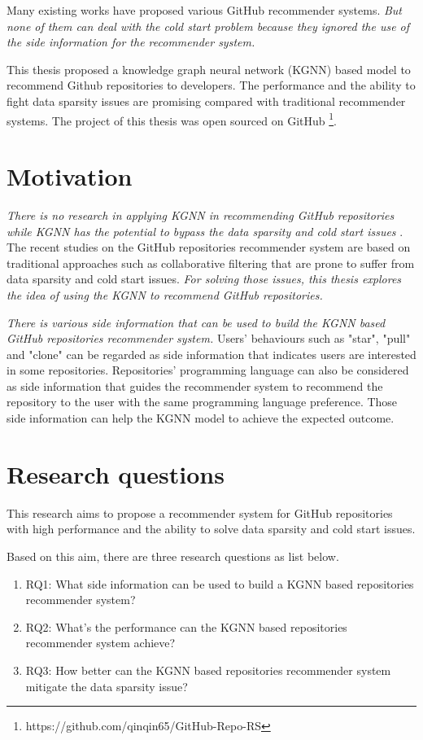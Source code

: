 \documentclass[11pt,twoside]{report}
\begin{document}
Many existing works have proposed various GitHub recommender systems. \textit{But none of them can deal with the cold start problem because they ignored the use of the side information for the recommender system.}

This thesis proposed a knowledge graph neural network (KGNN) based model to recommend Github repositories to developers. The performance and the ability to fight data sparsity issues are promising compared with traditional recommender systems. The project of this thesis was open sourced on GitHub \footnote{https://github.com/qinqin65/GitHub-Repo-RS}.

\section{Motivation}
\textit{There is no research in applying KGNN in recommending GitHub repositories while KGNN has the potential to bypass the data sparsity and cold start issues} \cite{mansur_review_nodate}. The recent studies on the GitHub repositories recommender system are based on traditional approaches such as collaborative filtering that are prone to suffer from data sparsity and cold start issues. \textit{For solving those issues, this thesis explores the idea of using the KGNN to recommend GitHub repositories.}

\textit{There is various side information that can be used to build the KGNN based GitHub repositories recommender system.} Users’ behaviours such as "star", "pull" and "clone" can be regarded as side information that indicates users are interested in some repositories. Repositories' programming language can also be considered as side information that guides the recommender system to recommend the repository to the user with the same programming language preference. Those side information can help the KGNN model to achieve the expected outcome.

\section{Research questions}
This research aims to propose a recommender system for GitHub repositories with high performance and the ability to solve data sparsity and cold start issues.

Based on this aim, there are three research questions as list below.

\begin{enumerate}
    \item RQ1: What side information can be used to build a KGNN based repositories recommender system?
    \item RQ2: What’s the performance can the KGNN based repositories recommender system achieve?
    \item RQ3: How better can the KGNN based repositories recommender system mitigate the data sparsity issue?
\end{enumerate}
\end{document}
